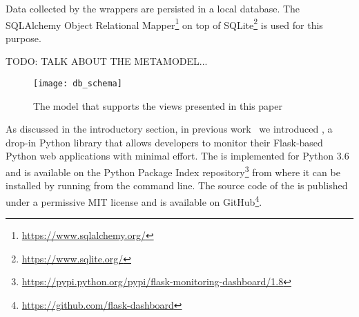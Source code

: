   Data collected by the wrappers are persisted in a local database. The SQLAlchemy Object Relational Mapper\footnote{\url{https://www.sqlalchemy.org/}} on top of SQLite\footnote{\url{https://www.sqlite.org/}} is used for this purpose.

TODO: TALK ABOUT THE METAMODEL...


    \begin{figure}[ht!]
      \centering
        \texttt{[image: db\_schema]}
        \caption{The model that supports the views presented in this paper}
        \label{fig:sep}
    \end{figure}

  As discussed in the introductory section, in previous work~\cite{vogel2017low} we introduced \tool, a drop-in Python library that allows developers to monitor their Flask-based Python web applications with minimal effort.
%
  The \tool is implemented for Python 3.6 and is available on the Python Package Index repository\footnote{\url{https://pypi.python.org/pypi/flask-monitoring-dashboard/1.8}} from where it can be installed by running \install from the command line. 
%  
  The source code of the \tool is published under a permissive MIT license and is available on GitHub\footnote{\url{https://github.com/flask-dashboard}}.
  
  


